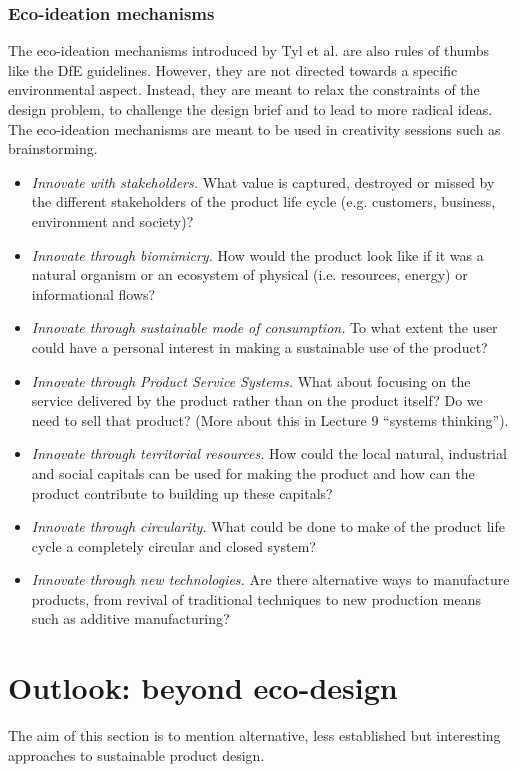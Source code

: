 \documentclass{article}
\begin{document}
\subsubsection{Eco-ideation mechanisms}
\label{sec:ecoAsit}
The eco-ideation mechanisms introduced by Tyl et al. \cite{tyl2016esm} are also rules of thumbs like the DfE guidelines. However, they are not directed towards a specific environmental aspect. Instead, they are meant to relax the constraints of the design problem, to challenge the design brief and to lead to more radical ideas. The eco-ideation mechanisms are meant to be used in creativity sessions such as brainstorming. 
\begin{itemize}
	\item \emph{Innovate with stakeholders.} What value is captured, destroyed or missed by the different stakeholders of the product life cycle (e.g. customers, business, environment and society)?
	\item \emph{Innovate through biomimicry.} How would the product look like if it was a natural organism or an ecosystem of physical (i.e. resources, energy) or informational flows?
	\item \emph{Innovate through sustainable mode of consumption.} To what extent the user could have a personal interest in making a sustainable use of the product?
	\item \emph{Innovate through Product Service Systems.} What about focusing on the service delivered by the product rather than on the product itself? Do we need to sell that product? (More about this in Lecture 9 ``systems thinking'').
	\item \emph{Innovate through territorial resources.} How could the local natural, industrial and social capitals can be used for making the product and how can the product contribute to building up these capitals?
	\item \emph{Innovate through circularity.} What could be done to make of the product life cycle a completely circular and closed system?
	\item \emph{Innovate through new technologies.} Are there alternative ways to manufacture products, from revival of traditional techniques to new production means such as additive manufacturing?
\end{itemize}

\section{Outlook: beyond eco-design}
\label{sec:SPD}
The aim of this section is to mention alternative, less established but interesting approaches to sustainable product design.
\end{document}
